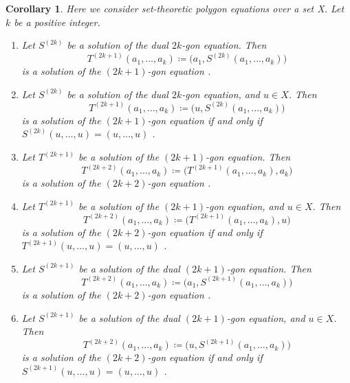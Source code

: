 \documentclass[pdftex]{sigma}
\numberwithin{equation}{section}
\newtheorem{Corollary}[Theorem]{Corollary}
\theoremstyle{definition}
\begin{document}
\begin{Corollary}
 Here we consider set-theoretic polygon equations over a set X. Let $k$ be a positive integer.
 \begin{enumerate}\itemsep=0pt
 \item[$(1)$] Let $S^{(2k)}$ be a solution of the dual $2k$-gon equation. Then
 \begin{equation*}
 T^{(2k+1)}(a_1,\dots, a_k) \coloneqq \bigl(a_1,S^{(2k)}(a_1,\dots, a_k)\bigr)
 \end{equation*}
 is a solution of the $(2k+1)$-gon equation {\rm \cite[\emph{Conjecture}~7.32]{muller2024structure}}.
 \item[$(2)$] Let $S^{(2k)}$ be a solution of the dual $2k$-gon equation, and $u\in X$. Then
 \begin{equation*}
 T^{(2k+1)}(a_1,\dots, a_k) \coloneqq \bigl(u,S^{(2k)}(a_1,\dots, a_k)\bigr)
 \end{equation*}
 is a solution of the $(2k+1)$-gon equation if and only if $S^{(2k)}(u,\dots, u)=(u,\dots,u)$ {\rm \cite[\emph{Conjecture}~7.33]{muller2024structure}}.
 \item[$(3)$] Let $T^{(2k+1)}$ be a solution of the $(2k+1)$-gon equation. Then
 \begin{equation*}
 T^{(2k+2)}(a_1,\dots, a_k) \coloneqq \bigl(T^{(2k+1)}(a_1,\dots, a_k),a_k\bigr)
 \end{equation*}
 is a solution of the $(2k+2)$-gon equation {\rm \cite[\emph{Conjecture}~7.34]{muller2024structure}}.
 \item[$(4)$] Let $T^{(2k+1)}$ be a solution of the $(2k+1)$-gon equation, and $u\in X$. Then
 \begin{equation*}
 T^{(2k+2)}(a_1,\dots, a_k) \coloneqq \bigl(T^{(2k+1)}(a_1,\dots, a_k),u\bigr)
 \end{equation*}
 is a solution of the $(2k+2)$-gon equation if and only if $T^{(2k+1)}(u,\dots, u)=(u,\dots,u)$ {\rm \cite[\emph{Conjecture}~7.35]{muller2024structure}}.
 \item[$(5)$] Let $S^{(2k+1)}$ be a solution of the dual $(2k+1)$-gon equation. Then
 \begin{equation*}
 T^{(2k+2)}(a_1,\dots, a_k) \coloneqq \bigl(a_1,S^{(2k+1)}(a_1,\dots, a_k)\bigr)
 \end{equation*}
 is a solution of the $(2k+2)$-gon equation {\rm \cite[\emph{Conjecture}~7.36]{muller2024structure}}.
 \item[$(6)$] Let $S^{(2k+1)}$ be a solution of the dual $(2k+1)$-gon equation, and $u\in X$. Then
 \begin{equation*}
 T^{(2k+2)}(a_1,\dots, a_k) \coloneqq \bigl(u,S^{(2k+1)}(a_1,\dots, a_k)\bigr)
 \end{equation*}
 is a solution of the $(2k+2)$-gon equation if and only if $S^{(2k+1)}(u,\dots, u)=(u,\dots,u)$ {\rm \cite[\emph{Conjecture}~7.37]{muller2024structure}}.
 \end{enumerate}
\end{Corollary}
\end{document}

